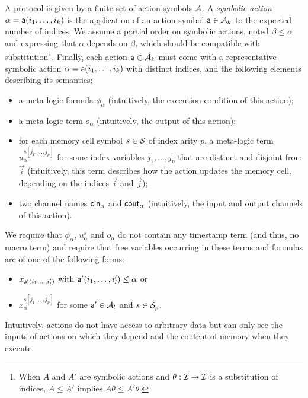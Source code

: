 \begin{definition} \label{def:action} \label{def:proto}
  A protocol is given by a finite set of action symbols $\mathcal{A}$.
  A \emph{symbolic action} $\alpha = \textsf{a}(i_1,\ldots,i_k)$
  is the application of an action symbol $\textsf{a} \in \mathcal{A}_k$
  to the expected  number of indices.
  We assume a partial order on symbolic actions,
  noted $\beta \leq \alpha$ and expressing that $\alpha$ depends on $\beta$,
  which should be compatible with substitution\footnote{
    When $A$ and $A'$ are symbolic actions and $\theta : \mathcal{I} \to \mathcal{I}$
    is a substitution of indices,
    $A \leq A'$ implies $A\theta \leq A'\theta$.
  }.
  Finally, each action $\textsf{a} \in \mathcal{A}_k$ must come with
  a representative symbolic action $\alpha = \textsf{a}(i_1,\ldots,i_k)$
  with distinct indices,
  and the following elements describing its semantics:
  \begin{itemize}
    \item a meta-logic formula $\phi_{\alpha}$
      (intuitively, the execution condition of this action);
    \item a meta-logic term $o_{\alpha}$
      (intuitively, the output of this action);
    \item for each memory cell symbol $s \in \mathcal{S}$ of index arity $p$,
      a meta-logic term $u_{\alpha}^{s[j_1,\ldots,j_p]}$
      for some index variables $j_1,\ldots,j_p$
      that are distinct and disjoint from $\vec{i}$
      (intuitively, this term describes how the action updates the memory
      cell, depending on the indices $\vec{i}$ and $\vec{j}$);
    \item two channel names $\mathsf{cin}_\alpha$ and $\mathsf{cout}_\alpha$
      (intuitively, the input and output channels of this action).
  \end{itemize}
  We require that
  $\phi_{\alpha}$, $u_{\alpha}^{s}$ and $o_{\alpha}$ do not contain any
  timestamp term (and thus, no macro term) and require that
  free variables occurring in these terms and formulas are
  of one of the following forms:
  \begin{itemize}
    \item $x_{\textsf{a}'(i_1,\ldots,i'_l)}$
      with $\textsf{a}'(i_1,\ldots,i'_l)\leq \alpha$ or
    \item $x^{s[j_1,\ldots,j_p]}_\alpha$
      for some $\textsf{a}' \in \mathcal{A}_l$ and $s \in \mathcal{S}_p$.
  \end{itemize}
  Intuitively, actions do not have access to arbitrary data but can only
  see the inputs of actions on which they depend
  and the content of memory when they execute.
\end{definition}


